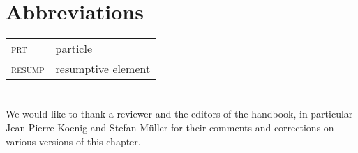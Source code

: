 \documentclass[output=paper
,notxmath 
 	        ,biblatex
                ,babelshorthands
                ,newtxmath
                ,draftmode
                ,colorlinks, citecolor=brown
]{langscibook}
\begin{document}
\section*{Abbreviations}

\begin{tabularx}{.99\textwidth}{@{}lX}
\textsc{prt} & particle\\
\textsc{resump} & resumptive element \\
\end{tabularx}



\section*{\acknowledgmentsEN}

We would like to thank a reviewer and the editors of the handbook, in particular
Jean-Pierre Koenig and Stefan Müller for their comments and
corrections on various versions of this chapter. 





 

{\sloppy
\printbibliography[heading=subbibliography,notkeyword=this]
}
\end{document}
